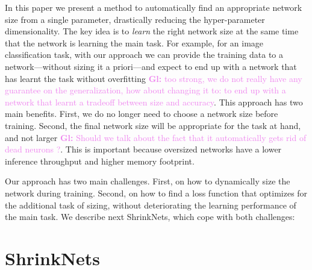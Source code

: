 \documentclass[sigconf]{acmart}
\newcommand{\gl}[1]{\textcolor{violet}{{\bf Gl:} #1}}
\begin{document}
In this paper we present a method to automatically find an appropriate network
size from a single parameter, drastically reducing the hyper-parameter
dimensionality. The key idea is to \emph{learn} the right network size at the
same time that the network is learning the main task. For example, for an image
classification task, with our approach we can provide the training data to a
network---without sizing it a priori---and expect to end up with a network that
has learnt the task without overfitting \gl{too strong, we do not really have
  any guarantee on the generalization, how about changing it to: to end up with
  a network that learnt a tradeoff between size and accuracy}. This approach
has two main benefits. First, we do no longer need to choose a network size
before training.  Second, the final network size will be appropriate for the
task at hand, and not larger \gl{Should we talk about the fact that it automatically gets rid of dead neurons ?}. This is important because oversized networks have
a lower inference throughput and higher  memory footprint.

Our approach has two main challenges. First, on how to dynamically size the
network during training. Second, on how to find a loss function that optimizes
for the additional task of sizing, without deteriorating the learning
performance of the main task. We describe next ShrinkNets, which cope with both
challenges:

% 
% 

\section{ShrinkNets}
\end{document}
